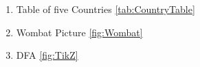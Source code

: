 \documentclass[12pt]{scrartcl}
\begin{document}
\exercise{}
    \cite{DBLP:journals/tifs/Frank0ASAK0RS23}
    \newline
    \cite{DBLP:journals/iacr/Groth16}

\exercise{}
    \begin{enumerate}
        \item Table of five Countries \ref{tab:CountryTable}\\
        \item Wombat Picture \ref{fig:Wombat}\\
        \item DFA \ref{fig:TikZ}
    \end{enumerate}


\cite{s2011}





\end{document}
